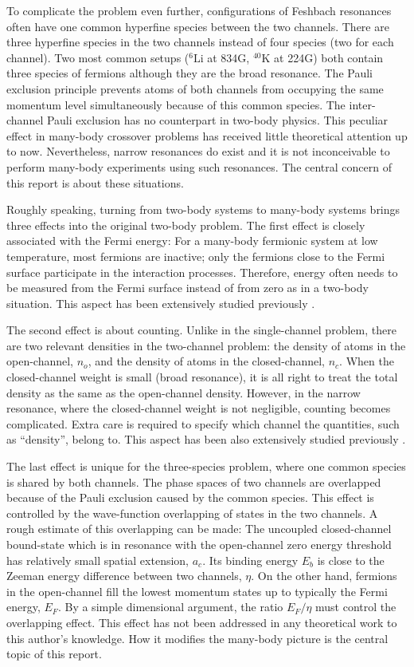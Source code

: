 \documentclass[reprint,pra]{revtex4-1}
\begin{document}
To complicate the problem even further,   configurations of Feshbach resonances often have one common hyperfine species between the two channels. There are three hyperfine species in the  two channels instead of four species (two for each channel).  Two most common setups (${}^{6}\text{Li}$ at 834G, $^{40}\text{K}$ at 224G) both contain three species of fermions although they are the broad resonance.  The Pauli exclusion principle prevents  atoms of both channels from occupying the same momentum level simultaneously because of this common species.  The inter-channel Pauli exclusion has no counterpart in two-body physics. This peculiar effect  in many-body crossover problems has  received little theoretical attention up to now.    Nevertheless,   narrow resonances do exist \cite{ChinRMP} and it is not  inconceivable to perform many-body experiments using such resonances.  The central concern of this report is about these situations. 

Roughly speaking, turning from two-body systems to many-body systems brings three effects into the original two-body problem.  The first effect is closely associated with the Fermi energy:  For a many-body fermionic system at low temperature, most fermions are inactive; only the fermions close to the Fermi surface participate in the interaction processes. Therefore, energy often needs to be measured from the Fermi surface instead of from zero as in a two-body situation. This aspect has been extensively studied previously \cite{GurarieNarrow}.

The second effect is about counting. Unlike in the single-channel problem, there are two relevant densities in the two-channel problem: the density of atoms in the open-channel, $n_{o}$, and the density of atoms in the closed-channel, $n_{c}$. When the closed-channel weight is small (broad resonance), it is all right to treat the total density as the same as the open-channel density.  However, in the narrow resonance, where the closed-channel weight is not negligible, counting becomes complicated.  Extra care is required to specify which channel the  quantities, such as ``density'', belong to.  This aspect has been  also extensively studied previously \cite{GurarieNarrow}.

The last effect is unique for the three-species problem, where one common species is shared by both channels.  The phase spaces of two channels are overlapped because of the Pauli exclusion caused by the common species. This effect is controlled by the wave-function overlapping of states in the two channels. A rough estimate of this overlapping can be made: The uncoupled closed-channel bound-state which is in resonance with the open-channel zero energy threshold has  relatively small  spatial extension, $a_c$.  Its binding energy $E_b$ is close to the Zeeman energy difference between two channels, $\eta$.  On the other hand, fermions in the open-channel fill the lowest  momentum states up to typically the Fermi energy, $E_F$.  By a simple dimensional argument, the ratio $E_F/\eta$ must control the overlapping effect. This effect has  not been addressed in any theoretical work to this author's knowledge.  How it modifies the many-body picture is the central topic of this report. 
\end{document}

